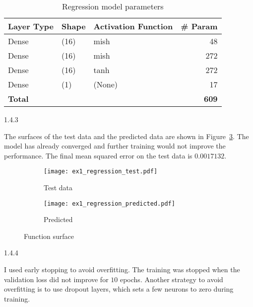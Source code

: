 \begin{table}[ht!]
  \centering
  \begin{tabular}{|l|l|l|r|}
    \hline
    \textbf{Layer Type} & \textbf{Shape} & \textbf{Activation Function} & \textbf{\# Param} \\ \hline
    Dense               & (16)           & mish                         & 48                \\ \hline
    Dense               & (16)           & mish                         & 272               \\ \hline
    Dense               & (16)           & tanh                         & 272               \\ \hline
    Dense               & (1)            & (None)                       & 17                \\ \hline\hline
    \textbf{Total}      &                &                              & \textbf{609}      \\ \hline
  \end{tabular}
  \caption{Regression model parameters}
  \label{tab:ex1_regression_model}
\end{table}


\begin{task}{1.4.3}
\end{task}

The surfaces of the test data and the predicted data are shown in
Figure~\ref{fig:ex1_regression_surface}. The model has already converged and further training would
not improve the performance. The final mean squared error on the test data is $0.0017132$.

\begin{figure}[ht!]
  \centering
  \begin{subfigure}{0.49\textwidth}
    \texttt{[image: ex1\_regression\_test.pdf]}
    \caption{Test data}
    \label{fig:ex1_regression_test}
  \end{subfigure}
  \begin{subfigure}{0.49\textwidth}
    \texttt{[image: ex1\_regression\_predicted.pdf]}
    \caption{Predicted}
    \label{fig:ex1_regression_predicted}
  \end{subfigure}
  \caption{Function surface}
  \label{fig:ex1_regression_surface}
\end{figure}


\begin{task}{1.4.4}
\end{task}

I used early stopping to avoid overfitting. The training was stopped when the validation loss did
not improve for $10$ epochs. Another strategy to avoid overfitting is to use dropout layers, which
sets a few neurons to zero during training.

